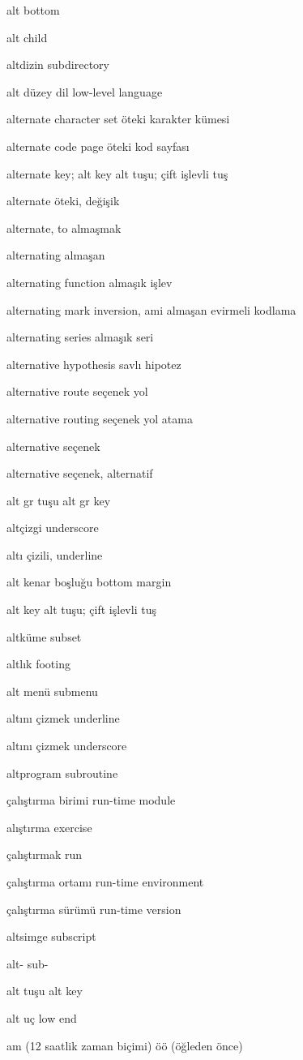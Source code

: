 \documentclass[12pt,fleqn]{article}\usepackage{../../common}
\begin{document}
alt bottom

alt child

altdizin subdirectory

alt düzey dil low-level language

alternate character set öteki karakter kümesi

alternate code page öteki kod sayfası

alternate key; alt key alt tuşu; çift işlevli tuş

alternate öteki, değişik

alternate, to almaşmak

alternating almaşan

alternating function almaşık işlev

alternating mark inversion, ami almaşan evirmeli kodlama

alternating series almaşık seri

alternative hypothesis savlı hipotez

alternative route seçenek yol

alternative routing seçenek yol atama

alternative seçenek

alternative seçenek, alternatif

alt gr tuşu alt gr key

altçizgi underscore

altı çizili, underline

alt kenar boşluğu bottom margin

alt key alt tuşu; çift işlevli tuş

altküme subset

altlık footing

alt menü submenu

altını çizmek underline

altını çizmek underscore

altprogram subroutine

çalıştırma birimi run-time module

alıştırma exercise

çalıştırmak run

çalıştırma ortamı run-time environment

çalıştırma sürümü run-time version

altsimge subscript

alt- sub-

alt tuşu alt key

alt uç low end

am (12 saatlik zaman biçimi) öö (öğleden önce)
\end{document}
